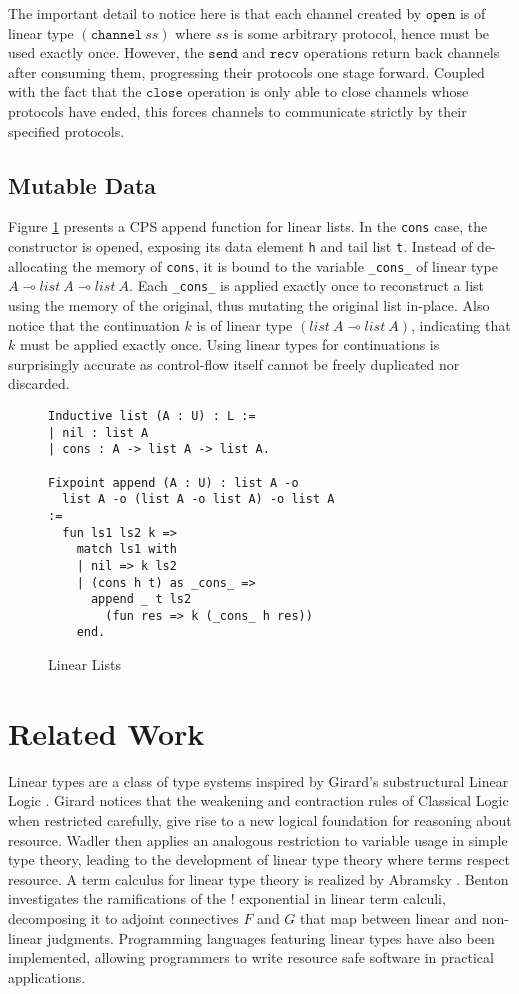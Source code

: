 \documentclass[sigplan,screen,review,anonymous]{acmart}
\newcommand{\channel}{\texttt{channel}}
\newcommand{\open}{\texttt{open}}
\newcommand{\close}{\texttt{close}}
\newcommand{\send}{\texttt{send}}
\newcommand{\recv}{\texttt{recv}}
\begin{document}
The important detail to notice here is that each channel created by $\open$ is of linear type $(\channel\ ss)$ where $ss$ is some arbitrary protocol, hence must be used exactly once. However, the $\send$ and $\recv$ operations return back channels after consuming them, progressing their protocols one stage forward. Coupled with the fact that the $\close$ operation is only able to close channels whose protocols have ended, this forces channels to communicate strictly by their specified protocols.

\subsection{Mutable Data}
Figure \ref{list} presents a CPS append function for linear lists. In the \texttt{cons} case, the constructor is opened, exposing its data element \texttt{h} and tail list \texttt{t}. Instead of de-allocating the memory of \texttt{cons}, it is bound to the variable \texttt{_cons_} of linear type $A \multimap list\ A \multimap list\ A$. Each \texttt{_cons_} is applied exactly once to reconstruct a list using the memory of the original, thus mutating the original list in-place. Also notice that the continuation $k$ is of linear type $(list\ A \multimap list\ A)$, indicating that $k$ must be applied exactly once. Using linear types for continuations is surprisingly accurate as control-flow itself cannot be freely duplicated nor discarded.

\begin{figure}[h]
  \caption{Linear Lists}
  \begin{verbatim}
Inductive list (A : U) : L :=
| nil : list A
| cons : A -> list A -> list A.

Fixpoint append (A : U) : list A -o 
  list A -o (list A -o list A) -o list A 
:=
  fun ls1 ls2 k =>
    match ls1 with
    | nil => k ls2
    | (cons h t) as _cons_ =>
      append _ t ls2 
        (fun res => k (_cons_ h res))
    end.
  \end{verbatim}
  \label{list}
  \Description{}
\end{figure}

\section{Related Work}
Linear types are a class of type systems inspired by Girard's substructural Linear Logic \cite{girard}. Girard notices that the weakening and contraction rules of Classical Logic when restricted carefully, give rise to a new logical foundation for reasoning about resource. Wadler \cite{wadler1990,wadler1991} then applies an analogous restriction to variable usage in simple type theory, leading to the development of linear type theory where terms respect resource. A term calculus for linear type theory is realized by Abramsky \cite{abramsky1993}. Benton \cite{benton1994} investigates the ramifications of the ! exponential in linear term calculi, decomposing it to adjoint connectives $F$ and $G$ that map between linear and non-linear judgments. Programming languages \cite{l3,ats,linear-haskell} featuring linear types have also been implemented, allowing programmers to write resource safe software in practical applications.
\end{document}
